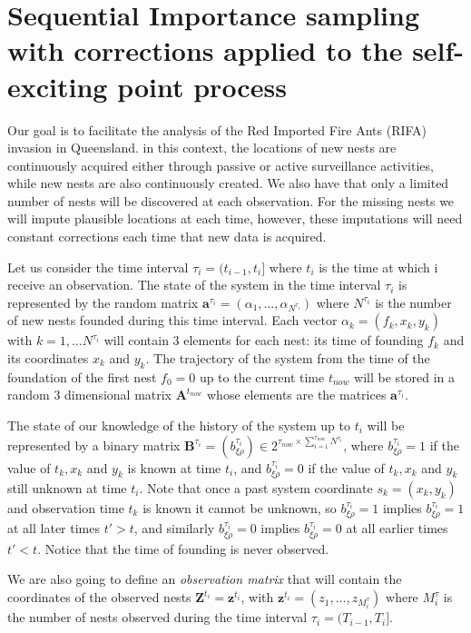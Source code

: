 \documentclass[11pt,a4paper]{article}
\renewcommand{\vec}[1]{\mathbf{#1}}
\begin{document}
{\section{Sequential Importance sampling with corrections applied to the self-exciting point process}

Our goal is to facilitate the analysis of the Red Imported Fire Ants (RIFA) invasion in Queensland. in this context, the locations of new nests are continuously acquired either through passive or active surveillance activities, while new nests are also continuously created. We also have that only a limited number of nests will be discovered at each observation. For the missing nests we will impute plausible locations at each time, however, these imputations will need constant corrections each time that new data is acquired. 

Let us consider the time interval $\tau_i = (t_{i-1}, t_i]$ where $t_i$ is the time at which i receive an observation. The state of the system in the time interval $\tau_i$ is represented by the random matrix $\vec{a}^{\tau_i} = (\alpha_1, \dots, \alpha_{N^{\tau_i}})$ where $N^{\tau_i}$ is the number of new nests founded during this time interval. Each vector $\alpha_k = (f_k, x_k, y_k)$ with $k = 1, \dots N^{\tau_i}$ will contain 3 elements for each nest: its time of founding $f_k$ and its coordinates $x_k$ and $y_k$. The trajectory of the system from the time of the foundation of the first nest $f_0 = 0$ up to the current time $t_{now}$ will be stored in a random 3 dimensional matrix $\vec{A}^{t_{now}}$ whose elements are the matrices $\vec{a}^{\tau_i}$.

The state of our knowledge of the history of the system up to $t_{i}$ will be represented by a binary matrix $\vec{B}^{\tau_{i}} = (b^{\tau_i}_{\xi \rho}) \in 2^{\tau_{now} \times \sum_{i=1}^{\tau_{now}} N^{\tau_i}}$, where $b^{\tau_i}_{\xi \rho} = 1$ if the value of $t_k, x_k$ and $y_k$ is known at time $t_i$, and $b^{\tau_i}_{\xi \rho} = 0$ if the value of $t_k, x_k$ and $y_k$ still unknown at time $t_i$. Note that once a past system coordinate $s_k = (x_k, y_k)$ and observation time $t_k$ is known it cannot be unknown, so $b^{\tau_i}_{\xi \rho} = 1$ implies $b^{\tau_i}_{\xi \rho} = 1$ at all later times $t' > t$, and similarly $b^{\tau_i}_{\xi \rho} = 0$ implies $b^{\tau_i}_{\xi \rho} = 0$ at all earlier times $t' < t$. Notice that the time of founding is never observed.

We are also going to define an \textit{observation matrix} that will contain the coordinates of the observed nests $\vec{Z}^{t_i} = \vec{z}^{t_i}$, with $\vec{z}^{t_i} = (z_1, \dots, z_{M^\tau_i})$ where $M^\tau_i$ is the number of nests observed during the time interval $\tau_i = (T_{i-1}, T_i]$.

}
\end{document}
